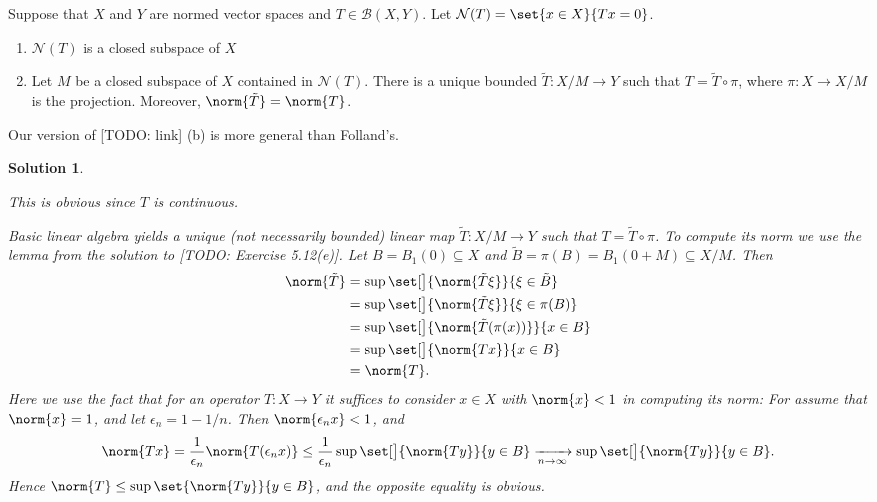 \documentclass[article, a4paper, 11pt, oneside]{memoir}
\numberwithin{equation}{chapter}
\newcommand{\calB}{\mathcal{B}}
\newcommand{\calN}{\mathcal{N}}
\theoremstyle{nonumberplain}
\newtheorem{solution}{Solution}
\begin{document}
\begin{exerciseframed*}[15]
	Suppose that $X$ and $Y$ are normed vector spaces and $T \in \calB(X,Y)$. Let $\calN(T) = \set{x \in X}{Tx = 0}$.
	\begin{enumerate}
		\item $\calN(T)$ is a closed subspace of $X$
		\item Let $M$ be a closed subspace of $X$ contained in $\calN(T)$. There is a unique bounded $\tilde{T} \colon X/M \to Y$ such that $T = \tilde{T} \circ \pi$, where $\pi \colon X \to X/M$ is the projection. Moreover, $\norm{\tilde{T}} = \norm{T}$.
	\end{enumerate}
\end{exerciseframed*}
%
Our version of [TODO: link] (b) is more general than Folland's.

\begin{solution}
\begin{solutionsec}
	\item This is obvious since $T$ is continuous.
	
	\item Basic linear algebra yields a unique (not necessarily bounded) linear map $\tilde{T} \colon X/M \to Y$ such that $T = \tilde{T} \circ \pi$. To compute its norm we use the lemma from the solution to [TODO: Exercise 5.12(e)]. Let $B = B_1(0) \subseteq X$ and $\tilde{B} = \pi(B) = B_1(0 + M) \subseteq X/M$. Then
	\begin{align*}
		\norm{\tilde{T}}
			&= \sup\set[\big]{ \norm{\tilde{T}\xi} }{\xi \in \tilde{B}} \\
			&= \sup\set[\big]{ \norm{\tilde{T}\xi} }{\xi \in \pi(B)} \\
			&= \sup\set[\big]{ \norm{\tilde{T}(\pi(x))} }{x \in B} \\
			&= \sup\set[\big]{ \norm{Tx} }{x \in B} \\
			&= \norm{T}.
	\end{align*}
	Here we use the fact that for an operator $T \colon X \to Y$ it suffices to consider $x \in X$ with $\norm{x} < 1$ in computing its norm: For assume that $\norm{x} = 1$, and let $\epsilon_n = 1 - 1/n$. Then $\norm{\epsilon_n x} < 1$, and
	\begin{equation*}
		\norm{Tx}
			= \frac{1}{\epsilon_n} \norm{T(\epsilon_n x)}
			\leq \frac{1}{\epsilon_n} \sup\set[\big]{ \norm{Ty} }{y \in B}
			\xrightarrow[n\to\infty]{} \sup\set[\big]{ \norm{Ty} }{y \in B}.
	\end{equation*}
	Hence $\norm{T} \leq \sup\set{ \norm{Ty} }{y \in B}$, and the opposite equality is obvious.
\end{solutionsec}
\end{solution}
\end{document}
